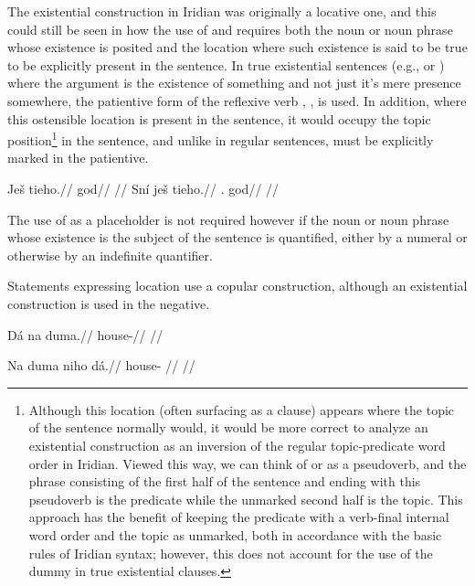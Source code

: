 The existential construction in Iridian was originally a locative one, and this could still be seen in how the use of  and  requires both the noun or noun phrase whose existence is posited and the location where such existence is said to be true to be explicitly present in the sentence. In true existential sentences (e.g.,  or ) where the argument is the existence of something and not just it's mere presence somewhere, the patientive form of the reflexive verb , , is used. In addition, where this ostensible location is present in the sentence, it would occupy the topic position\footnote{Although this location (often surfacing as a  clause) appears where the topic of the sentence normally would, it would be more correct to analyze an existential construction as an inversion of the regular topic-predicate word order in Iridian. Viewed this way, we can think of  or  as a pseudoverb, and the phrase consisting of the first half of the sentence and ending with this pseudoverb is the predicate while the unmarked second half is the topic. This approach has the benefit of keeping the predicate with a verb-final internal word order and the topic as unmarked, both in accordance with the basic rules of Iridian syntax; however, this does not account for the use of the dummy  in true existential clauses.} in the sentence, and unlike in regular sentences, must be explicitly marked in the patientive.


\begin{multicols}{2}
\pex
\a\begingl
\gla \ljudge{*}Ješ tieho.//
\glb \Exst{} god//
\glft {}//
\endgl
\a\begingl
\gla Sn\'i ješ tieho.//
\glb \Refl{}.\Pat{} \Exst{} god//
\glft {}//
\endgl
\xe
\end{multicols}

The use of  as a placeholder is not required however if the noun or noun phrase whose existence is the subject of the sentence is quantified, either by a numeral or otherwise by an indefinite quantifier.

Statements expressing location use a copular construction, although an existential construction is used in the negative.

\pex
\begingl
\gla Dá na duma.//
\glb {} \Loc{} house-\Pat{}//
\glft {}//
\endgl
\xe

\pex
\begingl
\gla Na duma niho dá.//
\glb \Loc{} house-\Pat{} \N{}\Exst{} //
\glft {}//
\endgl
\xe

